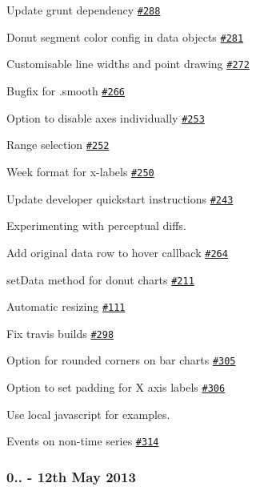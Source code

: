 \begin{DoxyItemize}
\item Update grunt dependency \href{https://github.com/morrisjs/morris.js/issues/228}{\tt \#288}
\item Donut segment color config in data objects \href{https://github.com/morrisjs/morris.js/issues/281}{\tt \#281}
\item Customisable line widths and point drawing \href{https://github.com/morrisjs/morris.js/issues/272}{\tt \#272}
\item Bugfix for .smooth \href{https://github.com/morrisjs/morris.js/issues/266}{\tt \#266}
\item Option to disable axes individually \href{https://github.com/morrisjs/morris.js/issues/253}{\tt \#253}
\item Range selection \href{https://github.com/morrisjs/morris.js/issues/252}{\tt \#252}
\item Week format for x-\/labels \href{https://github.com/morrisjs/morris.js/issues/250}{\tt \#250}
\item Update developer quickstart instructions \href{https://github.com/morrisjs/morris.js/issues/243}{\tt \#243}
\item Experimenting with perceptual diffs.
\item Add original data row to hover callback \href{https://github.com/morrisjs/morris.js/issues/264}{\tt \#264}
\item set\+Data method for donut charts \href{https://github.com/morrisjs/morris.js/issues/211}{\tt \#211}
\item Automatic resizing \href{https://github.com/morrisjs/morris.js/issues/111}{\tt \#111}
\item Fix travis builds \href{https://github.com/morrisjs/morris.js/issues/298}{\tt \#298}
\item Option for rounded corners on bar charts \href{https://github.com/morrisjs/morris.js/issues/305}{\tt \#305}
\item Option to set padding for X axis labels \href{https://github.com/morrisjs/morris.js/issues/306}{\tt \#306}
\item Use local javascript for examples.
\item Events on non-\/time series \href{https://github.com/morrisjs/morris.js/issues/314}{\tt \#314}
\end{DoxyItemize}

\subsubsection*{0.. -\/ 12th May 2013}


